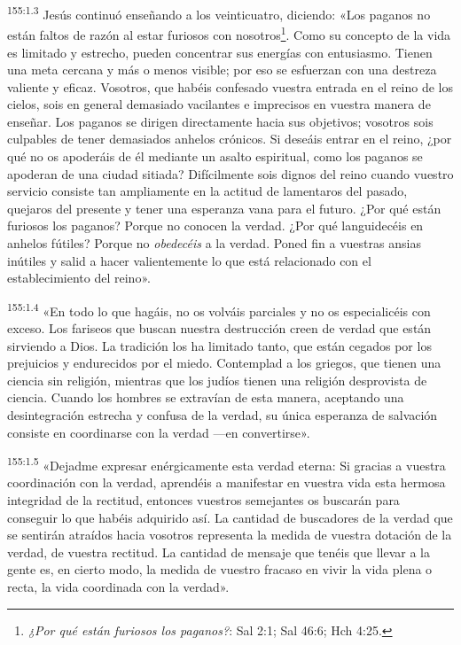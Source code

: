\par
\textsuperscript{155:1.3} Jesús continuó enseñando a los veinticuatro, diciendo: «Los paganos no están faltos de razón al estar furiosos con nosotros\footnote{\textit{¿Por qué están furiosos los paganos?}: Sal 2:1; Sal 46:6; Hch 4:25.}. Como su concepto de la vida es limitado y estrecho, pueden concentrar sus energías con entusiasmo. Tienen una meta cercana y más o menos visible; por eso se esfuerzan con una destreza valiente y eficaz. Vosotros, que habéis confesado vuestra entrada en el reino de los cielos, sois en general demasiado vacilantes e imprecisos en vuestra manera de enseñar. Los paganos se dirigen directamente hacia sus objetivos; vosotros sois culpables de tener demasiados anhelos crónicos. Si deseáis entrar en el reino, ¿por qué no os apoderáis de él mediante un asalto espiritual, como los paganos se apoderan de una ciudad sitiada? Difícilmente sois dignos del reino cuando vuestro servicio consiste tan ampliamente en la actitud de lamentaros del pasado, quejaros del presente y tener una esperanza vana para el futuro. ¿Por qué están furiosos los paganos? Porque no conocen la verdad. ¿Por qué languidecéis en anhelos fútiles? Porque no \textit{obedecéis} a la verdad. Poned fin a vuestras ansias inútiles y salid a hacer valientemente lo que está relacionado con el establecimiento del reino».

\par
\textsuperscript{155:1.4} «En todo lo que hagáis, no os volváis parciales y no os especialicéis con exceso. Los fariseos que buscan nuestra destrucción creen de verdad que están sirviendo a Dios. La tradición los ha limitado tanto, que están cegados por los prejuicios y endurecidos por el miedo. Contemplad a los griegos, que tienen una ciencia sin religión, mientras que los judíos tienen una religión desprovista de ciencia. Cuando los hombres se extravían de esta manera, aceptando una desintegración estrecha y confusa de la verdad, su única esperanza de salvación consiste en coordinarse con la verdad ---en convertirse».

\par
\textsuperscript{155:1.5} «Dejadme expresar enérgicamente esta verdad eterna: Si gracias a vuestra coordinación con la verdad, aprendéis a manifestar en vuestra vida esta hermosa integridad de la rectitud, entonces vuestros semejantes os buscarán para conseguir lo que habéis adquirido así. La cantidad de buscadores de la verdad que se sentirán atraídos hacia vosotros representa la medida de vuestra dotación de la verdad, de vuestra rectitud. La cantidad de mensaje que tenéis que llevar a la gente es, en cierto modo, la medida de vuestro fracaso en vivir la vida plena o recta, la vida coordinada con la verdad».

